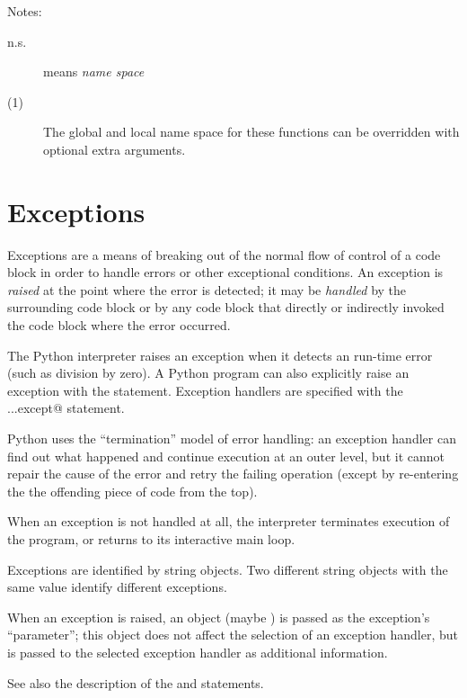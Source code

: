 Notes:

\begin{description}

\item[n.s.] means {\em name space}

\item[(1)] The global and local name space for these functions can be
overridden with optional extra arguments.

\end{description}

\section{Exceptions}

Exceptions are a means of breaking out of the normal flow of control
of a code block in order to handle errors or other exceptional
conditions.  An exception is {\em raised} at the point where the error
is detected; it may be {\em handled} by the surrounding code block or
by any code block that directly or indirectly invoked the code block
where the error occurred.

The Python interpreter raises an exception when it detects an run-time
error (such as division by zero).  A Python program can also
explicitly raise an exception with the \verb@raise@ statement.
Exception handlers are specified with the \verb@try...except@
statement.

Python uses the ``termination'' model of error handling: an exception
handler can find out what happened and continue execution at an outer
level, but it cannot repair the cause of the error and retry the
failing operation (except by re-entering the the offending piece of
code from the top).

When an exception is not handled at all, the interpreter terminates
execution of the program, or returns to its interactive main loop.

Exceptions are identified by string objects.  Two different string
objects with the same value identify different exceptions.

When an exception is raised, an object (maybe \verb@None@) is passed
as the exception's ``parameter''; this object does not affect the
selection of an exception handler, but is passed to the selected
exception handler as additional information.

See also the description of the \verb@try@ and \verb@raise@
statements.
